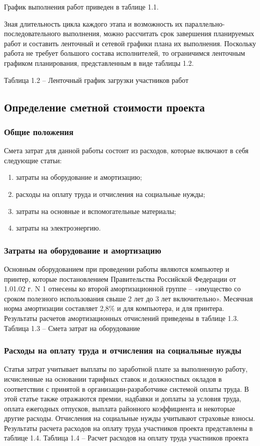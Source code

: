 График выполнения работ приведен в таблице 1.1.

Зная длительность цикла каждого этапа и возможность их параллельно-последовательного выполнения, можно рассчитать срок завершения планируемых работ и составить ленточный и сетевой графики плана их выполнения. Поскольку работа не требует большого состава исполнителей, то ограничимся ленточным графиком планирования, представленным в виде таблицы 1.2.

Таблица 1.2 – Ленточный график загрузки участников работ

\subsection{Определение сметной стоимости проекта}
\subsubsection{Общие положения}
Смета затрат для данной работы состоит из расходов, которые включают в себя следующие статьи:
\begin{enumerate}
\item затраты на оборудование и амортизацию;
\item расходы на оплату труда и отчисления на социальные нужды;
\item затраты на основные и вспомогательные материалы;
\item затраты на электроэнергию.
\end{enumerate}
\subsubsection{Затраты на оборудование и амортизацию}
Основным оборудованием при проведении работы являются компьютер и принтер, которые постановлением Правительства Российской Федерации от 1.01.02 г. N 1 отнесены ко второй амортизационной группе – «имущество со сроком полезного использования свыше 2 лет до 3 лет включительно». Месячная норма амортизации составляет 2,8\% и для компьютера, и для принтера.
Результаты расчетов амортизационных отчислений приведены в таблице 1.3.
Таблица 1.3 – Смета затрат на оборудование
\subsubsection{Расходы на оплату труда и отчисления на социальные нужды}
Статья затрат учитывает выплаты по заработной плате за выполненную работу, исчисленные на основании тарифных ставок и должностных окладов в соответствии с принятой в организации-разработчике системой оплаты труда. В этой статье также отражаются премии, надбавки и доплаты за условия труда, оплата ежегодных отпусков, выплата районного коэффициента и некоторые другие расходы. Отчисления на социальные нужды учитывают страховые взносы.
Результаты расчета расходов на оплату труда участников проекта представлены в таблице 1.4.
Таблица 1.4 – Расчет расходов на оплату труда участников проекта
